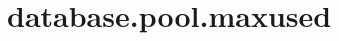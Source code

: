 \section{database.pool.maxused}
\label{configuration:DatabasePoolMaxused}
\AvailableInJavaOnly{\TODO}